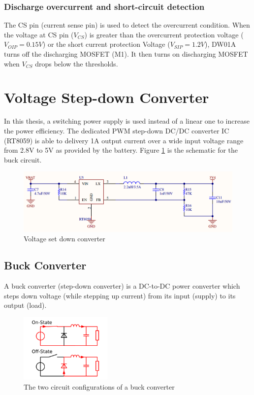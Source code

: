 \documentclass[\main/main.tex]{subfiles}
\begin{document}
\subsubsection{Discharge overcurrent and short-circuit detection}
The CS pin (current sense pin) is used to detect the overcurrent condition. When the voltage at CS pin ($V_{CS}$) is greater than the overcurrent protection voltage ($V_{OIP} = 0.15V$) or the short current protection Voltage ($V_{SIP} = 1.2V$), DW01A turns off the discharging MOSFET (M1). It then turns on discharging MOSFET when $V_{CS}$ drops below the thresholds.

\section{Voltage Step-down Converter}
In this thesis, a switching power supply is used instead of a linear one to increase the power efficiency. The dedicated PWM step-down DC/DC converter IC (RT8059) is able to delivery 1A output current over a wide input voltage range from 2.8V to 5V as provided by the battery. Figure \ref{fig:voltage_set_down_converter} is the schematic for the buck circuit.
\begin{figure}[H]
    \begin{center}
        \includegraphics[width=1\textwidth]{voltage_set_down_converter.png}
    \end{center}
    \caption{Voltage set down converter}
    \label{fig:voltage_set_down_converter}
\end{figure}
\subsection{Buck Converter}
A buck converter (step-down converter) is a DC-to-DC power converter which steps down voltage (while stepping up current) from its input (supply) to its output (load).

\begin{figure}[H]
    \begin{center}
        \includegraphics[width=0.4\textwidth]{buck_converter.png}
    \end{center}
    \caption{The two circuit configurations of a buck converter}
    \label{fig:buck_converter}
\end{figure}
\end{document}
